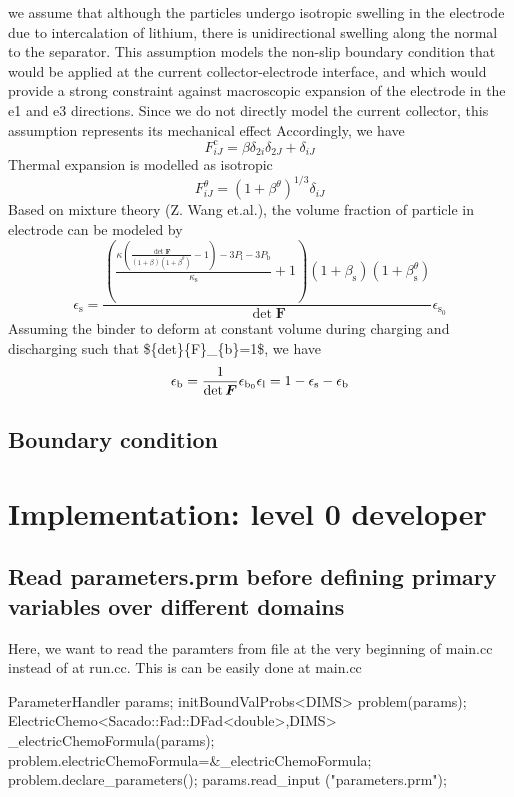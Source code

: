 we assume that although the particles undergo isotropic swelling in the electrode due to intercalation of lithium, there is unidirectional swelling along the normal to the separator. This assumption models the non-\/slip boundary condition that would be applied at the current collector-\/electrode interface, and which would provide a strong constraint against macroscopic expansion of the electrode in the e1 and e3 directions. Since we do not directly model the current collector, this assumption represents its mechanical effect Accordingly, we have \[ F^\text{c}_{iJ}=\beta\delta_{2i}\delta_{2J}+\delta_{iJ} \] Thermal expansion is modelled as isotropic \[ F^{\theta}_{iJ}=(1+\beta^{\theta})^{1/3}\delta_{iJ} \] Based on mixture theory (Z. Wang et.\-al.), the volume fraction of particle in electrode can be modeled by \[ \epsilon_\text{s}=\frac{\left( \frac{\kappa(\frac{\det\boldsymbol{F}}{(1+\beta)(1+\beta^\theta)}-1)-3P_\text{l}-3P_\text{b}}{\kappa_\text{s}} +1\right)(1+\beta_\text{s})(1+\beta_\text{s}^\theta)}{\det\boldsymbol{F}}\epsilon_{\text{s}_0} \] Assuming the binder to deform at constant volume during charging and discharging such that \$\{det\}\{F\}\-\_\-\{b\}=1\$, we have \[ \epsilon_\text{b}=\frac{1}{\det \boldsymbol{F}}\epsilon_{\text{b}_0}\\ \epsilon_\text{l}=1-\epsilon_{\text{s}}-\epsilon_\text{b} \] \hypertarget{battery_electrode_scale_sub2}{}\subsection{Boundary condition}\label{battery_electrode_scale_sub2}
 \hypertarget{battery_particle_Implementation}{}\section{Implementation\-: level 0 developer}\label{battery_particle_Implementation}
\hypertarget{battery_electrode_scale_sub1}{}\subsection{Read parameters.\-prm before defining primary variables over different domains}\label{battery_electrode_scale_sub1}
Here, we want to read the paramters from file at the very beginning of main.\-cc instead of at run.\-cc. This is can be easily done at main.\-cc 
\begin{DoxyCode}
ParameterHandler params;
initBoundValProbs<DIMS> problem(params);
ElectricChemo<Sacado::Fad::DFad<double>,DIMS> \_electricChemoFormula(params);
problem.electricChemoFormula=&\_electricChemoFormula;
problem.declare\_parameters();
params.read\_input (\textcolor{stringliteral}{"parameters.prm"});
\end{DoxyCode}
